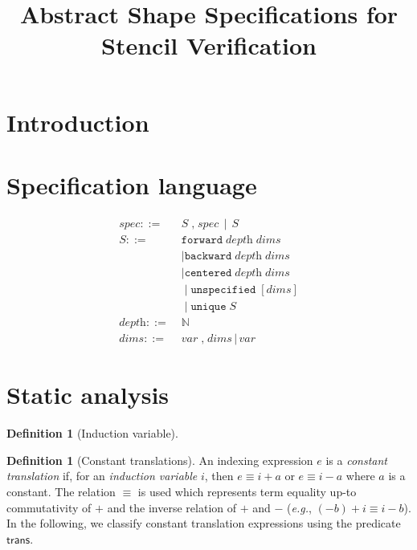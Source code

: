 \documentclass[10pt]{sigplanconf}
\title{Abstract Shape Specifications for Stencil Verification}
\newcounter{block}
\theoremstyle{definition}
\newtheorem{definition}[block]{Definition}
\newcommand{\eg}{\emph{e.g.}}
\begin{document}
\maketitle

\begin{abstract}
\end{abstract}



\section{Introduction}


\section{Specification language}

\begin{align*}
spec ::= & \; S  \; \texttt{,} \; spec \, \mid \, S \\[0.5em]
%
S ::= &  \; \texttt{forward} \; \textit{depth} \; \textit{dims} \\
& \; \mid \texttt{backward} \; \textit{depth} \; \textit{dims} \\
& \; \mid \texttt{centered} \; \textit{depth} \; \textit{dims} \\
& \; \mid \texttt{unspecified} \; [\textit{dims}] \\
& \; \mid \texttt{unique} \; S \\[0.5em]
\textit{depth} ::= & \; \mathbb{N} \\
\textit{dims}  ::= & \; \textit{var} \; \texttt{,} \; \textit{dims} \,
                      \mid \, \textit{var}
\end{align*}

\section{Static analysis}

\begin{definition}[Induction variable]

\end{definition}

\begin{definition}[Constant translations]
An indexing expression $e$ is a \emph{constant translation} if,
for an \emph{induction variable} $i$, then $e \equiv i + a$ or $e \equiv i - a$ 
where $a$ is a constant. The relation $\equiv$ is used which
represents term equality up-to commutativity of $+$ and the inverse
relation of $+$ and $-$ (\eg{}, $(-b) + i \equiv i - b$). 
In the following, we classify constant translation expressions 
using the predicate $\textsf{trans}$.
\end{definition}
\end{document}
